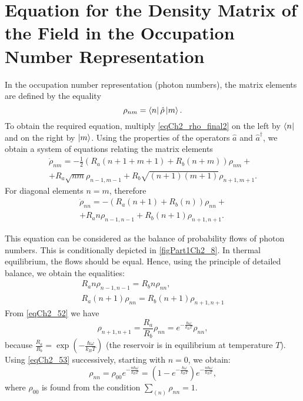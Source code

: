 \section{Equation for the Density Matrix of the Field in the Occupation Number Representation}
\label{ch2_7}
In the occupation number representation (photon numbers), the matrix elements are defined by the equality
\[
\rho_{nm} = \bra{n}\hat{\rho}\ket{m}.
\]
To obtain the required equation, multiply \eqref{eqCh2_rho_final2} on the left by $\bra{n}$ and on the right by $\ket{m}$. Using the properties of the operators $\hat{a}$ and $\hat{a}^{\dag}$, we obtain a system of equations relating the matrix elements
\begin{eqnarray}
\dot{\rho}_{nm} = - \frac{1}{2}
\left(
R_a\left(n + 1 + m + 1\right) + 
R_b\left(n + m\right)
\right)\rho_{nm} +
\nonumber \\
+ 
R_a\sqrt{nm}\rho_{n - 1, m - 1} +
R_b\sqrt{\left(n + 1\right)\left(m + 1\right)}\rho_{n + 1, m + 1}.
\label{eqCh2_task5}
\end{eqnarray}
For diagonal elements $n = m$, therefore
\begin{eqnarray}
\dot{\rho}_{nn} = - 
\left(
R_a\left(n + 1\right) + 
R_b\left(n\right)
\right)\rho_{nn} +
\nonumber \\
+ 
R_a n \rho_{n - 1, n - 1} +
R_b\left(n + 1\right)\rho_{n + 1, n + 1}.
\label{eqCh2_51}
\end{eqnarray}



This equation can be considered as the balance of probability flows of photon numbers. This is conditionally depicted in \autoref{figPart1Ch2_8}. In thermal equilibrium, the flows should be equal. Hence, using the principle of detailed balance, we obtain the equalities:
\begin{eqnarray}
R_a n \rho_{n - 1, n - 1} = R_b n \rho_{nn},
\nonumber \\
R_a \left(n + 1\right) \rho_{n n} = R_b 
\left(n + 1\right) \rho_{n + 1, n + 1}
\label{eqCh2_52}
\end{eqnarray}
From \eqref{eqCh2_52} we have
\begin{equation}
\rho_{n + 1, n + 1} = \frac{R_a}{R_b}\rho_{nn} = 
e^{-\frac{\hbar \omega}{k_B T}}\rho_{nn},
\label{eqCh2_53}
\end{equation}
because  
\(
\frac{R_a}{R_b} = 
\exp \left(-\frac{\hbar \omega}{k_B T}\right)
\)
(the reservoir is in equilibrium at temperature $T$). Using \eqref{eqCh2_53} successively, starting with $n = 0$, we obtain:  
\begin{equation}
\rho_{nn} = \rho_{00} 
e^{-\frac{n \hbar \omega}{k_B T}} =
\left(1 - e^{-\frac{\hbar \omega}{k_B T}}\right) 
e^{-\frac{n \hbar \omega}{k_B T}},
\end{equation}
where $\rho_{00}$ is found from the condition $\sum_{(n)}\rho_{nn} = 1$.

